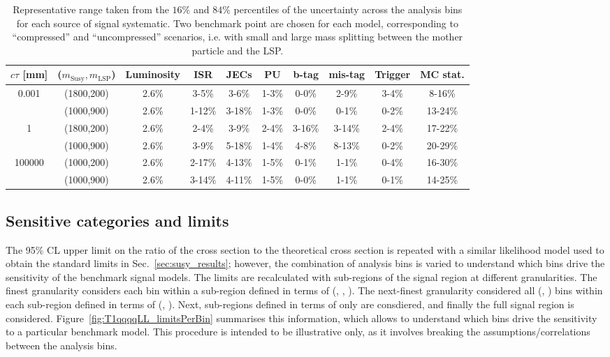 \begin{table}[h!]
    \scriptsize
    \caption{
        Representative range taken from the $16\%$ and $84\%$ percentiles of the
        uncertainty across the analysis bins for each source of signal
        systematic. Two benchmark point are chosen for each model, corresponding
        to ``compressed'' and ``uncompressed'' scenarios, i.e. with small and
        large mass splitting between the mother particle and the LSP. 
    }
    \label{tab:sig-systematics-LLP}
    \centering
    \begin{tabular}{ cccccccccc }
      \hline \hline
      $c\tau$ [mm] & ($m_{\mathrm{Susy}},m_{\mathrm{LSP}}$) 
      & Luminosity & ISR   & JECs   & PU     & b-tag & mis-tag & Trigger & MC stat.        \\ 
      \hline
      \multirow{2}{*}{0.001}
      & (1800,200) & 2.6\% & 3-5\%  & 3-6\%  & 1-3\% & 0-0\%   & 2-9\%   & 3-4\% & 8-16\%  \\
      & (1000,900) & 2.6\% & 1-12\% & 3-18\% & 1-3\% & 0-0\%   & 0-1\%   & 0-2\% & 13-24\% \\
      \hline
      \multirow{2}{*}{1}
      & (1800,200) & 2.6\% & 2-4\%  & 3-9\%  & 2-4\% & 3-16\%  & 3-14\%  & 2-4\% & 17-22\% \\
      & (1000,900) & 2.6\% & 3-9\%  & 5-18\% & 1-4\% & 4-8\%   & 8-13\%  & 0-2\% & 20-29\% \\        
      \hline
      \multirow{2}{*}{100000}
      & (1000,200) & 2.6\% & 2-17\% & 4-13\% & 1-5\% & 0-1\%   & 1-1\%   & 0-4\% & 16-30\% \\
      & (1000,900) & 2.6\% & 3-14\% & 4-11\% & 1-5\% & 0-0\%   & 1-1\%   & 0-1\% & 14-25\% \\
      \hline

        \hline \hline
    \end{tabular}
\end{table}

\clearpage
\subsection{Sensitive categories and limits}
\label{sec:LLP_results}

The 95\% CL upper limit on the ratio of the cross section to the
theoretical cross section is repeated with a similar likelihood model
used to obtain the standard limits in Sec.~\ref{sec:susy_results};
however, the combination of analysis bins is varied to understand
which bins drive the sensitivity of the benchmark signal models. The
limits are recalculated with sub-regions of the signal region at
different granularities. The finest granularity considers each \mht
bin within a sub-region defined in terms of (\njet, \nb, \scalht). The
next-finest granularity considered all (\scalht, \mht) bins within
each sub-region defined in terms of (\njet, \nb). Next, sub-regions
defined in terms of only \njet are consdiered, and finally the full
signal region is considered. Figure~\ref{fig:T1qqqqLL_limitsPerBin}
summarises this information, which allows to understand which bins
drive the sensitivity to a particular benchmark model. This procedure
is intended to be illustrative only, as it involves breaking the
assumptions/correlations between the analysis bins.

